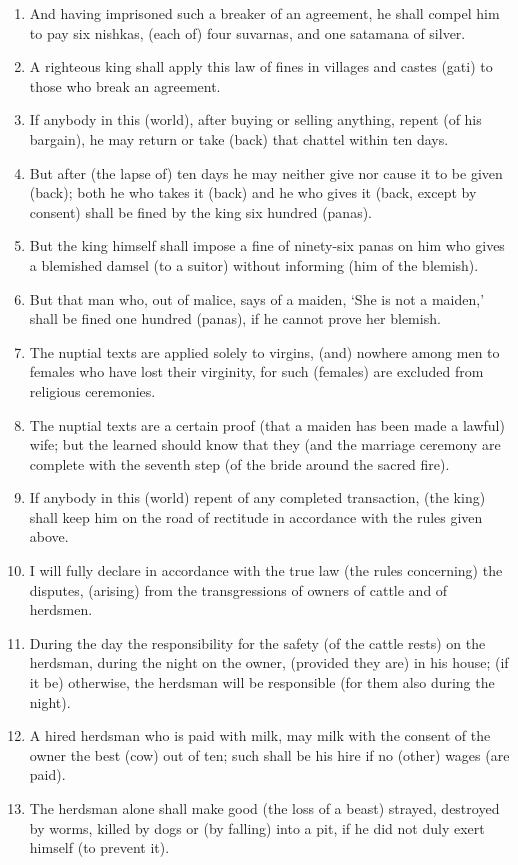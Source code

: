 \begin{enumerate}
\item And having imprisoned such a breaker of an agreement, he shall compel him to pay six nishkas, (each of) four suvarnas, and one satamana of silver.
\item A righteous king shall apply this law of fines in villages and castes (gati) to those who break an agreement.
\item If anybody in this (world), after buying or selling anything, repent (of his bargain), he may return or take (back) that chattel within ten days.
\item But after (the lapse of) ten days he may neither give nor cause it to be given (back); both he who takes it (back) and he who gives it (back, except by consent) shall be fined by the king six hundred (panas).
\item But the king himself shall impose a fine of ninety-six panas on him who gives a blemished damsel (to a suitor) without informing (him of the blemish).
\item But that man who, out of malice, says of a maiden, `She is not a maiden,' shall be fined one hundred (panas), if he cannot prove her blemish.
\item The nuptial texts are applied solely to virgins, (and) nowhere among men to females who have lost their virginity, for such (females) are excluded from religious ceremonies.
\item The nuptial texts are a certain proof (that a maiden has been made a lawful) wife; but the learned should know that they (and the marriage ceremony are complete with the seventh step (of the bride around the sacred fire).
\item If anybody in this (world) repent of any completed transaction, (the king) shall keep him on the road of rectitude in accordance with the rules given above.
\item I will fully declare in accordance with the true law (the rules concerning) the disputes, (arising) from the transgressions of owners of cattle and of herdsmen.
\item During the day the responsibility for the safety (of the cattle rests) on the herdsman, during the night on the owner, (provided they are) in his house; (if it be) otherwise, the herdsman will be responsible (for them also during the night).
\item A hired herdsman who is paid with milk, may milk with the consent of the owner the best (cow) out of ten; such shall be his hire if no (other) wages (are paid).
\item The herdsman alone shall make good (the loss of a beast) strayed, destroyed by worms, killed by dogs or (by falling) into a pit, if he did not duly exert himself (to prevent it).

\end{enumerate}
